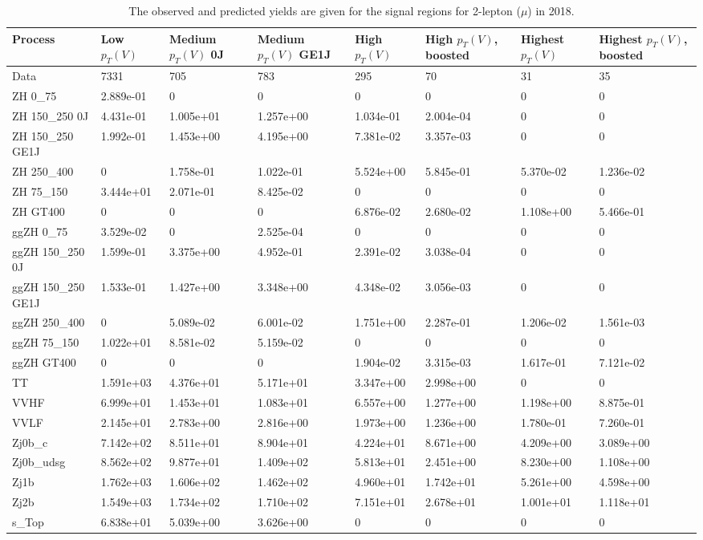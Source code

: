\begin{table}
\centering
\caption[2018 2-lepton ($\mu$) signal selection yields]{
                  The observed and predicted yields are given for the
                  signal regions for 2-lepton ($\mu$) in 2018.
                  }
{\footnotesize
\begin{tabularx}{\textwidth}{|X|X|X|X|X|X|X|X|}
\hline
Process & Low $p_{T}(V)$ & Medium $p_{T}(V)$ 0J & Medium $p_{T}(V)$ GE1J & High $p_{T}(V)$ & High $p_{T}(V)$, boosted & Highest $p_{T}(V)$ & Highest $p_{T}(V)$, boosted \\
\hline
Data & 7331 & 705 & 783 & 295 & 70 & 31 & 35 \\
\hline
ZH 0\_75 & 2.889e-01 & 0 & 0 & 0 & 0 & 0 & 0 \\
ZH 150\_250 0J & 4.431e-01 & 1.005e+01 & 1.257e+00 & 1.034e-01 & 2.004e-04 & 0 & 0 \\
ZH 150\_250 GE1J & 1.992e-01 & 1.453e+00 & 4.195e+00 & 7.381e-02 & 3.357e-03 & 0 & 0 \\
ZH 250\_400 & 0 & 1.758e-01 & 1.022e-01 & 5.524e+00 & 5.845e-01 & 5.370e-02 & 1.236e-02 \\
ZH 75\_150 & 3.444e+01 & 2.071e-01 & 8.425e-02 & 0 & 0 & 0 & 0 \\
ZH GT400 & 0 & 0 & 0 & 6.876e-02 & 2.680e-02 & 1.108e+00 & 5.466e-01 \\
ggZH 0\_75 & 3.529e-02 & 0 & 2.525e-04 & 0 & 0 & 0 & 0 \\
ggZH 150\_250 0J & 1.599e-01 & 3.375e+00 & 4.952e-01 & 2.391e-02 & 3.038e-04 & 0 & 0 \\
ggZH 150\_250 GE1J & 1.533e-01 & 1.427e+00 & 3.348e+00 & 4.348e-02 & 3.056e-03 & 0 & 0 \\
ggZH 250\_400 & 0 & 5.089e-02 & 6.001e-02 & 1.751e+00 & 2.287e-01 & 1.206e-02 & 1.561e-03 \\
ggZH 75\_150 & 1.022e+01 & 8.581e-02 & 5.159e-02 & 0 & 0 & 0 & 0 \\
ggZH GT400 & 0 & 0 & 0 & 1.904e-02 & 3.315e-03 & 1.617e-01 & 7.121e-02 \\
\hline
TT & 1.591e+03 & 4.376e+01 & 5.171e+01 & 3.347e+00 & 2.998e+00 & 0 & 0 \\
VVHF & 6.999e+01 & 1.453e+01 & 1.083e+01 & 6.557e+00 & 1.277e+00 & 1.198e+00 & 8.875e-01 \\
VVLF & 2.145e+01 & 2.783e+00 & 2.816e+00 & 1.973e+00 & 1.236e+00 & 1.780e-01 & 7.260e-01 \\
Zj0b\_c & 7.142e+02 & 8.511e+01 & 8.904e+01 & 4.224e+01 & 8.671e+00 & 4.209e+00 & 3.089e+00 \\
Zj0b\_udsg & 8.562e+02 & 9.877e+01 & 1.409e+02 & 5.813e+01 & 2.451e+00 & 8.230e+00 & 1.108e+00 \\
Zj1b & 1.762e+03 & 1.606e+02 & 1.462e+02 & 4.960e+01 & 1.742e+01 & 5.261e+00 & 4.598e+00 \\
Zj2b & 1.549e+03 & 1.734e+02 & 1.710e+02 & 7.151e+01 & 2.678e+01 & 1.001e+01 & 1.118e+01 \\
s\_Top & 6.838e+01 & 5.039e+00 & 3.626e+00 & 0 & 0 & 0 & 0 \\
\hline
\end{tabularx}
}
\label{tab:sr-Zmm-2018}
\end{table}

